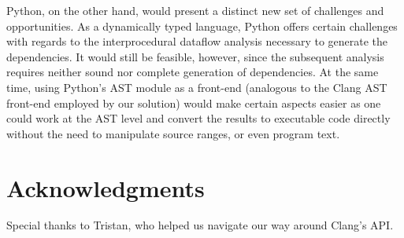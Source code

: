 \documentclass[preprint]{acm_proc_article-sp}
\begin{document}
Python, on the other hand, would present a distinct new set of challenges and
opportunities. As a dynamically typed language, Python offers certain challenges
with regards to the interprocedural dataflow analysis necessary to generate the
dependencies. It would still be feasible, however, since the subsequent analysis
requires neither sound nor complete generation of dependencies. At the same
time, using Python's AST module as a front-end (analogous to the Clang AST
front-end employed by our solution) would make certain aspects easier as one
could work at the AST level and convert the results to executable code directly
without the need to manipulate source ranges, or even program text.

\section{Acknowledgments}

Special thanks to Tristan, who helped us navigate our way around Clang's API.



\end{document}

